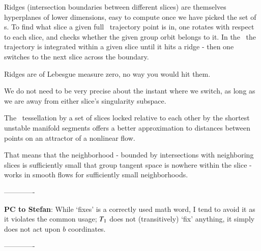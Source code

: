 Ridges (intersection boundaries between different slices) are themselves
hyperplanes of lower dimensions, easy to compute once we have picked
the set of {\template s}. To find what slice a given full \statesp\
trajectory point is in, one rotates with respect to each slice, and
checks whether the given group orbit belongs to it. In the \reducedsp\
the trajectory is integrated within a given slice until it hits a ridge -
then one switches to the next slice across the boundary.

Ridges are of Lebesgue measure zero, no way you would hit them.

We do not need to be very precise about the instant
where we switch, as long as we are away from either slice's singularity
subspace.

The \reducedsp\ tessellation by a set of slices
locked relative to each other by the shortest unstable manifold segments
offers a better approximation to distances between points on an attractor
of a nonlinear flow.

That means that the neighborhood - bounded by intersections with
neighboring slices is sufficiently small that group tangent space is
nowhere within the slice - works in smooth flows for sufficiently small
neighborhoods.

-------------

{\bf PC to Stefan}:
	While `fixes' is a correctly used math word, I tend to avoid it 	
as it violates the common usage; $T_1$ does not (transitively) `fix'
anything, 	it simply does not act upon $b$ coordinates.

-------------
